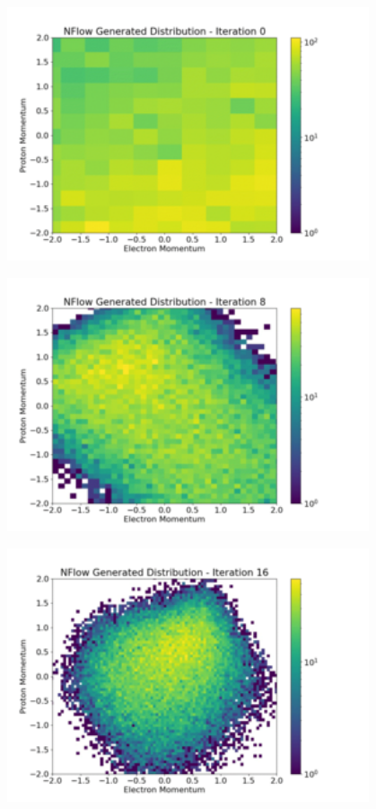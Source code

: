 \documentclass[aspectratio=169]{beamer}
\begin{document}
\iffalse
\begin{frame}[noframenumbering]\centering\includegraphics[width=0.8\textwidth]{images/400training/400training-0.png}\end{frame}
\begin{frame}[noframenumbering]\centering\includegraphics[width=0.8\textwidth]{images/400training/400training-1.png}\end{frame}
\begin{frame}[noframenumbering]\centering\includegraphics[width=0.8\textwidth]{images/400training/400training-2.png}\end{frame}
\end{document}
